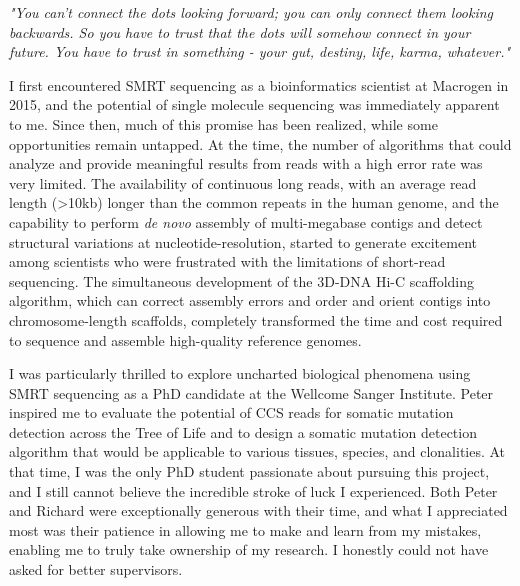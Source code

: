 
\begin{acknowledgements}      

\textit{"You can't connect the dots looking forward; you can only connect them looking backwards. So you have to trust that the dots will somehow connect in your future. You have to trust in something - your gut, destiny, life, karma, whatever."} 
\begin{flushright}  \end{flushright}

I first encountered SMRT sequencing as a bioinformatics scientist at Macrogen in 2015, and the potential of single molecule sequencing was immediately apparent to me. Since then, much of this promise has been realized, while some opportunities remain untapped. At the time, the number of algorithms that could analyze and provide meaningful results from reads with a high error rate was very limited. The availability of continuous long reads, with an average read length (>10kb) longer than the common repeats in the human genome, and the capability to perform \textit{de novo} assembly of multi-megabase contigs and detect structural variations at nucleotide-resolution, started to generate excitement among scientists who were frustrated with the limitations of short-read sequencing. The simultaneous development of the 3D-DNA Hi-C scaffolding algorithm, which can correct assembly errors and order and orient contigs into chromosome-length scaffolds, completely transformed the time and cost required to sequence and assemble high-quality reference genomes.
 
I was particularly thrilled to explore uncharted biological phenomena using SMRT sequencing as a PhD candidate at the Wellcome Sanger Institute. Peter inspired me to evaluate the potential of CCS reads for somatic mutation detection across the Tree of Life and to design a somatic mutation detection algorithm that would be applicable to various tissues, species, and clonalities. At that time, I was the only PhD student passionate about pursuing this project, and I still cannot believe the incredible stroke of luck I experienced. Both Peter and Richard were exceptionally generous with their time, and what I appreciated most was their patience in allowing me to make and learn from my mistakes, enabling me to truly take ownership of my research. I honestly could not have asked for better supervisors.


\end{acknowledgements}
